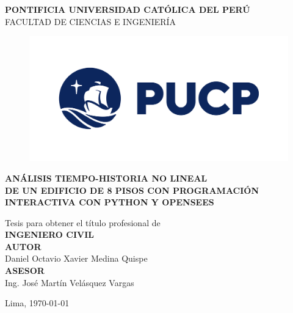\begin{titlepage}
    \begin{center}
        {\Large \bf PONTIFICIA UNIVERSIDAD CATÓLICA DEL PERÚ}\\
        \vspace{8mm} 
        {\Large FACULTAD DE CIENCIAS E INGENIERÍA}\\
        
        \begin{figure}[H]
            \centering
            \includegraphics[width=15cm]{Imagenes/logopucp.png} %
        \end{figure}
        
        {\Large \bf ANÁLISIS TIEMPO-HISTORIA NO LINEAL} \\[0.3 cm]
        {\Large \bf DE UN EDIFICIO DE 8 PISOS CON PROGRAMACIÓN} \\[0.3 cm] 
        {\Large \bf INTERACTIVA CON PYTHON Y OPENSEES}\\
        
        \vspace{1 cm}
        
        {\large Tesis para obtener el título profesional de}\\[0.5cm]
        {\large \bf INGENIERO CIVIL}\\[1.0cm]
        
        {\large \bf AUTOR}\\[0.5 cm] 
        {\large Daniel Octavio Xavier Medina Quispe}\\[0.7 cm] 
        {\large \bf ASESOR}\\[0.5 cm] 
        {\large Ing. José Martín Velásquez Vargas}\\

        \vspace{1.3 cm}
        
        {Lima, \today}
    \end{center}
\end{titlepage}